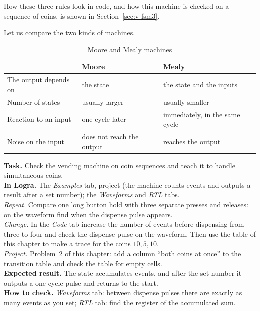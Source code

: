 How these three rules look in code, and how this machine is checked on a
sequence of coins, is shown in Section~\ref{sec:v-fsm3}.

Let us compare the two kinds of machines.

\begin{table}[H]
\centering
\caption{Moore and Mealy machines}
\small
\begin{tabularx}{\textwidth}{l X X}
\toprule
 & \textbf{Moore} & \textbf{Mealy} \\
\midrule
The output depends on & the state & the state and the inputs \\
Number of states & usually larger & usually smaller \\
Reaction to an input & one cycle later & immediately, in the same cycle \\
Noise on the input & does not reach the output & reaches the output \\
\bottomrule
\end{tabularx}
\end{table}

\begin{diybox}
\textbf{Task.} Check the vending machine on coin sequences and teach it to
handle simultaneous coins.\\
\textbf{In Logra.} The \emph{Examples} tab, project 
(the machine counts events and outputs a result after a set number);
the \emph{Waveforms} and \emph{RTL} tabs.\\
 \emph{Repeat.} Compare one long button hold with three separate
presses and releases: on the waveform find when the dispense pulse
appears.\\
 \emph{Change.} In the \emph{Code} tab increase the number of events
before dispensing from three to four and check the dispense pulse on the
waveform. Then use the table of this chapter to make a trace for the coins
$10, 5, 10$.\\
 \emph{Project.} Problem~2 of this chapter: add a column ``both coins
at once'' to the transition table and check the table for empty cells.\\
\textbf{Expected result.} The state accumulates events, and after the set
number it outputs a one-cycle pulse and returns to the start.\\
\textbf{How to check.} \emph{Waveforms} tab: between dispense pulses there are
exactly as many events as you set; \emph{RTL} tab: find the register of the
accumulated sum.
\end{diybox}

